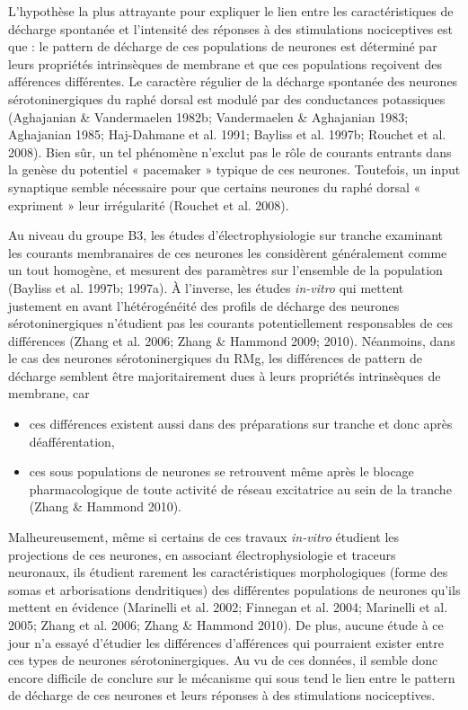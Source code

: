 \documentclass[a4paper,12pt,twoside]{report}
\begin{document}
L’hypothèse la plus attrayante pour expliquer le lien entre les caractéristiques de décharge spontanée et l’intensité des réponses à des stimulations nociceptives est que : le pattern de décharge de ces populations de neurones est déterminé par leurs propriétés intrinsèques de membrane et que ces populations reçoivent des afférences différentes.
Le caractère régulier de la décharge spontanée des neurones sérotoninergiques du raphé dorsal est modulé par des conductances potassiques (Aghajanian \& Vandermaelen 1982b; Vandermaelen \& Aghajanian 1983; Aghajanian 1985; Haj-Dahmane et al. 1991; Bayliss et al. 1997b; Rouchet et al. 2008). Bien sûr, un tel phénomène n’exclut pas le rôle de courants entrants dans la genèse du potentiel « pacemaker » typique de ces neurones. Toutefois, un input synaptique semble nécessaire pour que certains neurones du raphé dorsal « expriment » leur irrégularité (Rouchet et al. 2008). 

Au niveau du groupe B3, les études d’électrophysiologie sur tranche examinant les courants membranaires de ces neurones les considèrent généralement comme un tout homogène, et mesurent des paramètres sur l’ensemble de la population (Bayliss et al. 1997b; 1997a). À l’inverse, les études \textit{in-vitro} qui mettent justement en avant l’hétérogénéité des profils de décharge des neurones sérotoninergiques n’étudient pas les courants potentiellement responsables de ces différences (Zhang et al. 2006; Zhang \& Hammond 2009; 2010). Néanmoins, dans le cas des neurones sérotoninergiques du RMg, les différences de pattern de décharge semblent être majoritairement dues à leurs propriétés intrinsèques de membrane, car 

\begin{itemize}
\item ces différences existent aussi dans des préparations sur tranche et donc après déafférentation, 
\item ces sous populations de neurones se retrouvent même après le blocage pharmacologique de toute activité de réseau excitatrice au sein de la tranche (Zhang \& Hammond 2010).
\end{itemize}

Malheureusement, même si certains de ces travaux \textit{in-vitro} étudient les projections de ces neurones, en associant électrophysiologie et traceurs neuronaux, ils étudient rarement les caractéristiques morphologiques (forme des somas et arborisations dendritiques) des différentes populations de neurones qu’ils mettent en évidence (Marinelli et al. 2002; Finnegan et al. 2004; Marinelli et al. 2005; Zhang et al. 2006; Zhang \& Hammond 2010). De plus, aucune étude à ce jour n’a essayé d’étudier les différences d’afférences qui pourraient exister entre ces types de neurones sérotoninergiques. Au vu de ces données, il semble donc encore difficile de conclure sur le mécanisme qui sous tend le lien entre le pattern de décharge de ces neurones et leurs réponses à des stimulations nociceptives.
\end{document}
